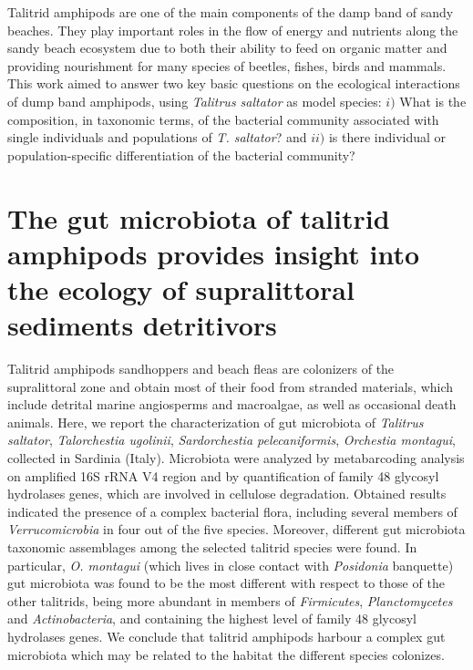 Talitrid amphipods are one of the main components of the damp band of sandy beaches. They play important roles in the flow of energy and nutrients along the sandy beach ecosystem due to both their ability to feed on organic matter and providing nourishment for many species of beetles, fishes, birds and mammals. This work aimed to answer two key basic questions on the ecological interactions of dump band amphipods, using \textit{Talitrus saltator} as model species: $i)$ What is the composition, in taxonomic terms, of the bacterial community associated with single individuals and populations of \textit{T. saltator}? and $ii)$ is there individual or population-specific differentiation of the bacterial community?\\

\newpage

\newpage


\section[The gut microbiota of talitrid amphipods provides insight into the ecology of supralittoral sediments detritivors]{The gut microbiota of talitrid amphipods provides insight into the ecology of supralittoral sediments detritivors%
}

Talitrid amphipods sandhoppers and beach fleas are colonizers of the supralittoral zone and obtain most of their food from stranded materials, which include detrital marine angiosperms and macroalgae, as well as occasional death animals. Here, we report the characterization of gut microbiota of \textit{Talitrus saltator}, \textit{Talorchestia ugolinii}, \textit{Sardorchestia pelecaniformis}, \textit{Orchestia montagui}, collected in Sardinia (Italy). Microbiota were analyzed by metabarcoding analysis on amplified 16S rRNA V4 region and by quantification of family 48 glycosyl hydrolases genes, which are involved in cellulose degradation. Obtained results indicated the presence of a complex bacterial flora, including several members of \textit{Verrucomicrobia} in four out of the five species. Moreover, different gut microbiota taxonomic assemblages among the selected talitrid species were found. In particular, \textit{O. montagui} (which lives in close contact with \textit{Posidonia} banquette) gut microbiota was found to be the most different with respect to those of the other talitrids, being more abundant in members of \textit{Firmicutes}, \textit{Planctomycetes} and \textit{Actinobacteria}, and containing the highest level of family 48 glycosyl hydrolases genes. We conclude that talitrid amphipods harbour a complex gut microbiota which may be related to the habitat the different species colonizes.\\

